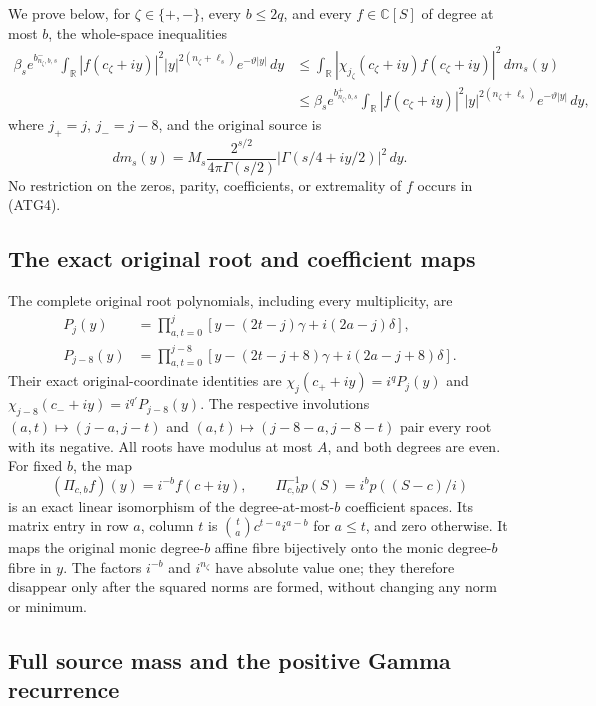 \documentclass[11pt,a4paper]{article}
\begin{document}
We prove below, for $\zeta\in\{+,-\}$, every $b\le2q$, and every
$f\in\mathbb C[S]$ of degree at most $b$, the whole-space inequalities
\[
\begin{split}
 \beta_s e^{b^-_{n_\zeta,b,s}}
  \int_{\mathbb R}|f(c_\zeta+iy)|^2
           |y|^{2(n_\zeta+\ell_s)}e^{-\vartheta|y|}\,dy
 &\le\int_{\mathbb R}|\chi_{j_\zeta}(c_\zeta+iy)
                 f(c_\zeta+iy)|^2\,dm_s(y)\\
 &\le\beta_s e^{b^+_{n_\zeta,b,s}}
  \int_{\mathbb R}|f(c_\zeta+iy)|^2
           |y|^{2(n_\zeta+\ell_s)}e^{-\vartheta|y|}\,dy,
\end{split}\tag{ATG4}
\]
where $j_+=j$, $j_-=j-8$, and the original source is
\[
 dm_s(y)=M_s\frac{2^{s/2}}{4\pi\Gamma(s/2)}
                 |\Gamma(s/4+iy/2)|^2\,dy.
\tag{ATG5}
\]
No restriction on the zeros, parity, coefficients, or extremality of
$f$ occurs in (ATG4).

\subsection{The exact original root and coefficient maps}

The complete original root polynomials, including every multiplicity,
are
\[
\begin{split}
 P_j(y)&=\prod_{a,t=0}^{j}
       [y-(2t-j)\gamma+i(2a-j)\delta],\\
 P_{j-8}(y)&=\prod_{a,t=0}^{j-8}
       [y-(2t-j+8)\gamma+i(2a-j+8)\delta].
\end{split}\tag{ATG6}
\]
Their exact original-coordinate identities are
$\chi_j(c_++iy)=i^qP_j(y)$ and
$\chi_{j-8}(c_-+iy)=i^{q'}P_{j-8}(y)$.
The respective involutions $(a,t)\mapsto(j-a,j-t)$ and
$(a,t)\mapsto(j-8-a,j-8-t)$ pair every root with its negative.
All roots have modulus at most $A$, and both degrees are even.
For fixed $b$, the map
\[
 (\Pi_{c,b}f)(y)=i^{-b}f(c+iy),\qquad
 \Pi_{c,b}^{-1}p(S)=i^bp((S-c)/i)
\tag{ATG7}
\]
is an exact linear isomorphism of the degree-at-most-$b$ coefficient
spaces. Its matrix entry in row $a$, column $t$ is
$\binom ta c^{t-a}i^{a-b}$ for $a\le t$, and zero otherwise.
It maps the original monic degree-$b$ affine fibre bijectively onto
the monic degree-$b$ fibre in $y$. The factors $i^{-b}$ and $i^{n_\zeta}$
have absolute value one; they therefore disappear only after the
squared norms are formed, without changing any norm or minimum.

\subsection{Full source mass and the positive Gamma recurrence}
\end{document}
